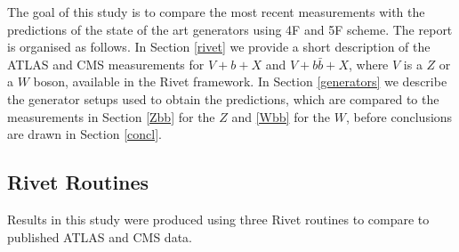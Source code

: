\documentclass[11pt]{cernrep} \usepackage{graphicx,epsfig} 
\begin{document}
The goal of this study is to compare the most recent measurements with the predictions of the state of the art
generators using 4F and 5F scheme. The report is organised as follows. In Section \ref{rivet} we provide a short
description of the ATLAS and CMS measurements for $V+b+X$ and $V+b\bar{b}+X$, where $V$ is a $Z$ or a $W$ boson,
available in the Rivet framework. In Section \ref{generators} we describe the generator setups used to obtain the
predictions, which are compared to the measurements in Section \ref{Zbb} for the $Z$ and \ref{Wbb} for the $W$, before
conclusions are drawn in Section \ref{concl}.   


\subsection{Rivet Routines \label{rivet}}

Results in this study were produced using three Rivet routines to compare to published ATLAS and CMS data.
\end{document}
